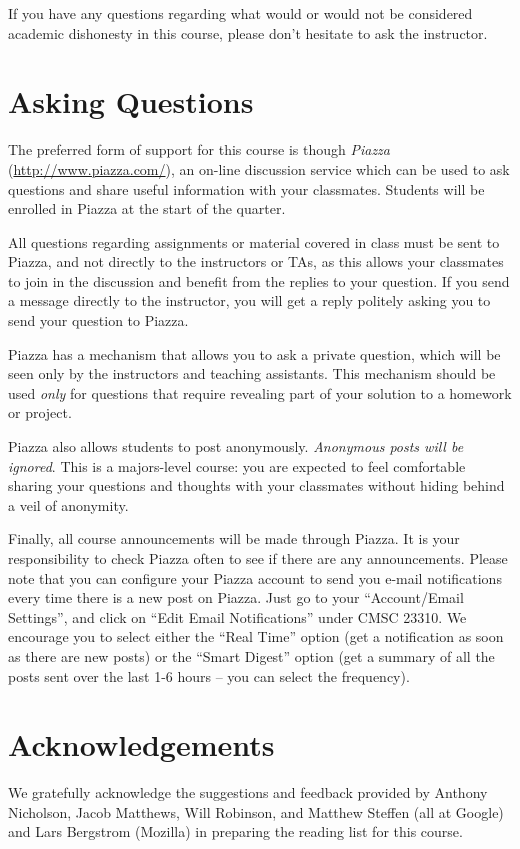 \documentclass[11pt]{article}
\begin{document}
If you have any questions regarding what would or would not be considered academic dishonesty in this course, please don't hesitate to ask the instructor.

\section{Asking Questions}
\label{asking}

The preferred form of support for this course is though \emph{Piazza} (\url{http://www.piazza.com/}), an on-line discussion service which can be used to ask questions and share useful information with your classmates. Students will be enrolled in Piazza at the start of the quarter.

All questions regarding assignments or material covered in class must be sent to Piazza, and not directly to the instructors or TAs, as this allows your classmates to join in the discussion and benefit from the replies to your question. If you send a message directly to the instructor, you will get a reply politely asking you to send your question to Piazza. 

Piazza has a mechanism that allows you to ask a private question, which will be seen only by the instructors and teaching assistants. This mechanism should be used \emph{only} for questions that require revealing part of your solution to a homework or project.

Piazza also allows students to post anonymously. \emph{Anonymous posts will be ignored}. This is a majors-level course: you are expected to feel comfortable sharing your questions and thoughts with your classmates without hiding behind a veil of anonymity.

Finally, all course announcements will be made through Piazza. It is your responsibility to check Piazza often to see if there are any announcements. Please note that you can configure your Piazza account to send you e-mail notifications every time there is a new post on Piazza. Just go to your ``Account/Email Settings'', and click on ``Edit Email Notifications'' under CMSC 23310. We 
encourage you to select either the ``Real Time'' option (get a notification as soon as there are new posts) or the ``Smart Digest'' option (get a summary of all the posts sent over the last 1-6 hours -- you can select the frequency).

\section{Acknowledgements}

We gratefully acknowledge the suggestions and feedback provided by Anthony Nicholson, Jacob Matthews, Will Robinson, and Matthew Steffen (all at Google) and Lars Bergstrom (Mozilla) in preparing the reading list for this course.
\end{document}
